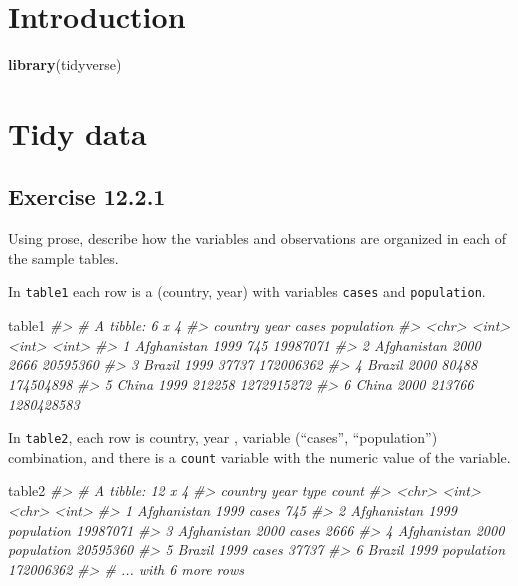 \documentclass[]{book}
\newenvironment{Shaded}{\begin{snugshade}}{\end{snugshade}}
\newcommand{\CommentTok}[1]{\textcolor[rgb]{0.56,0.35,0.01}{\textit{#1}}}
\newcommand{\KeywordTok}[1]{\textcolor[rgb]{0.13,0.29,0.53}{\textbf{#1}}}
\newcommand{\NormalTok}[1]{#1}
\theoremstyle{plain}
\theoremstyle{remark}
\begin{document}
\hypertarget{introduction-7}{%
\section{Introduction}\label{introduction-7}}

\begin{Shaded}
\begin{Highlighting}[]
\KeywordTok{library}\NormalTok{(tidyverse)}
\end{Highlighting}
\end{Shaded}

\hypertarget{tidy-data-1}{%
\section{Tidy data}\label{tidy-data-1}}

\hypertarget{exercise-12.2.1}{%
\subsection*{\texorpdfstring{Exercise
{12.2.1}}{Exercise 12.2.1}}\label{exercise-12.2.1}}

Using prose, describe how the variables and observations are organized
in each of the sample tables.

In \texttt{table1} each row is a (country, year) with variables
\texttt{cases} and \texttt{population}.

\begin{Shaded}
\begin{Highlighting}[]
\NormalTok{table1}
\CommentTok{#> # A tibble: 6 x 4}
\CommentTok{#>   country      year  cases population}
\CommentTok{#>   <chr>       <int>  <int>      <int>}
\CommentTok{#> 1 Afghanistan  1999    745   19987071}
\CommentTok{#> 2 Afghanistan  2000   2666   20595360}
\CommentTok{#> 3 Brazil       1999  37737  172006362}
\CommentTok{#> 4 Brazil       2000  80488  174504898}
\CommentTok{#> 5 China        1999 212258 1272915272}
\CommentTok{#> 6 China        2000 213766 1280428583}
\end{Highlighting}
\end{Shaded}

In \texttt{table2}, each row is country, year , variable (``cases'',
``population'') combination, and there is a \texttt{count} variable with
the numeric value of the variable.

\begin{Shaded}
\begin{Highlighting}[]
\NormalTok{table2}
\CommentTok{#> # A tibble: 12 x 4}
\CommentTok{#>   country      year type           count}
\CommentTok{#>   <chr>       <int> <chr>          <int>}
\CommentTok{#> 1 Afghanistan  1999 cases            745}
\CommentTok{#> 2 Afghanistan  1999 population  19987071}
\CommentTok{#> 3 Afghanistan  2000 cases           2666}
\CommentTok{#> 4 Afghanistan  2000 population  20595360}
\CommentTok{#> 5 Brazil       1999 cases          37737}
\CommentTok{#> 6 Brazil       1999 population 172006362}
\CommentTok{#> # ... with 6 more rows}
\end{Highlighting}
\end{Shaded}
\end{document}
